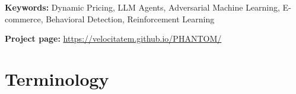 \documentclass[12pt,letterpaper]{article}
\begin{document}
\noindent\textbf{Keywords:} Dynamic Pricing, LLM Agents, Adversarial Machine Learning, E-commerce, Behavioral Detection, Reinforcement Learning

\vspace{0.5em}
\noindent\textbf{Project page:} \url{https://velocitatem.github.io/PHANTOM/}

\clearpage
\tableofcontents
\clearpage









\printbibliography

\clearpage
\appendix
\section{Terminology}
\end{document}

